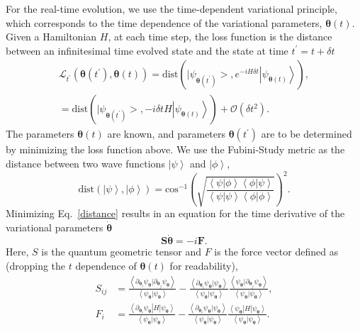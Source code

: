 \documentclass[aps,prb,twocolumn,superscriptaddress,a4paper,longbibliography]{revtex4-2}
\begin{document}
For the real-time evolution, we use the time-dependent variational principle, which corresponds to the time dependence of the variational parameters, $\boldsymbol{\theta}(t)$. Given a Hamiltonian $H$, at each time step, the loss function is the distance between an infinitesimal time evolved state and the state at time $t^\prime=t+\delta t$
\begin{align}
\nonumber    \mathcal{L}_{t^\prime}(\boldsymbol{\theta}(t^\prime),\boldsymbol{\theta}(t))=\text{dist}\left(\big|\psi_{\boldsymbol{\theta}(t^\prime)}\big>,e^{-iH\delta t}\left|\psi_{\boldsymbol{\theta}(t)}\right>\right),\\
    =\text{dist}\left(\big|\psi_{\boldsymbol{\theta}(t^\prime)}\big>,-i\delta tH\left|\psi_{\boldsymbol{\theta}(t)}\right>\right) + \mathcal{O}(\delta t^2).
    \label{distance}
\end{align}
The parameters $\boldsymbol{\theta}(t)$ are known, and parameters $\boldsymbol{\theta}(t^\prime)$ are to be determined by minimizing the loss function above. We use the Fubini-Study metric as the distance between two wave functions $\left|\psi\right>$ and $\left|\phi\right>$,
\begin{equation}
    \text{dist}(\left|\psi\right>,\left|\phi\right>)=\text{cos}^{-1}\left(\sqrt{\frac{\left<\psi|\phi\right>\left<\phi|\psi\right>}{\left<\psi|\psi\right>\left<\phi|\phi\right>}}\right)^2.
    \label{Fubini-Study}
\end{equation}
Minimizing Eq.~\eqref{distance} results in an equation for the time derivative of the variational parameters $\Dot{\boldsymbol{\theta}}$ \cite{carleo_solving_2017}
\begin{equation}
    \boldsymbol{S}\Dot{\boldsymbol{\theta}}=-i\boldsymbol{F}.
    \label{qgt}
\end{equation}
Here, $S$ is the quantum geometric tensor and $F$ is the force vector defined as (dropping the $t$ dependence of $\boldsymbol{\theta}(t)$ for readability),
\begin{align}
    S_{ij}&=\frac{\left<\partial_{\boldsymbol{\theta}_i}\psi_{\boldsymbol{\theta}}|\partial_{\boldsymbol{\theta}_j}\psi_{\boldsymbol{\theta}}\right>}{\left<\psi_{\boldsymbol{\theta}}|\psi_{\boldsymbol{\theta}}\right>}-\frac{\left<\partial_{\boldsymbol{\theta}_i}\psi_{\boldsymbol{\theta}}|\psi_{\boldsymbol{\theta}}\right>}{\left<\psi_{\boldsymbol{\theta}}|\psi_{\boldsymbol{\theta}}\right>} \frac{\left<\psi_{\boldsymbol{\theta}}|\partial_{\boldsymbol{\theta}_j}\psi_{\boldsymbol{\theta}}\right>}{\left<\psi_{\boldsymbol{\theta}}|\psi_{\boldsymbol{\theta}}\right>},\\
    F_i&=\frac{\left<\partial_{\boldsymbol{\theta}_i}\psi_{\boldsymbol{\theta}}\right|H\left|\psi_{\boldsymbol{\theta}}\right>}{\left<\psi_{\boldsymbol{\theta}}|\psi_{\boldsymbol{\theta}}\right>}-\frac{\left<\partial_{\boldsymbol{\theta}_i}\psi_{\boldsymbol{\theta}}|\psi_{\boldsymbol{\theta}}\right>}{\left<\psi_{\boldsymbol{\theta}}|\psi_{\boldsymbol{\theta}}\right>} \frac{\left<\psi_{\boldsymbol{\theta}}\right|H\left|\psi_{\boldsymbol{\theta}}\right>}{\left<\psi_{\boldsymbol{\theta}}|\psi_{\boldsymbol{\theta}}\right>}.
\end{align}
\end{document}

